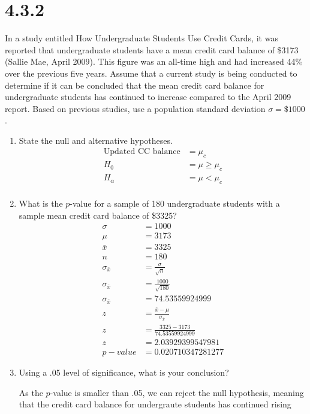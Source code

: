 \documentclass{article}
\begin{document}
\section*{4.3.2}
In a study entitled How Undergraduate Students Use Credit Cards, it was reported that undergraduate students have a mean credit card balance of \$3173 (Sallie Mae, April 2009). This figure was an all-time high and had increased 44\% over the previous five years. Assume that a current study is being conducted to determine if it can be concluded that the mean credit card balance for undergraduate students has continued to increase compared to the April 2009 report. Based on previous studies, use a population standard deviation $\sigma =\$1000$.
\begin{enumerate}
  \item State the null and alternative hypotheses.
  \begin{align*}
    \text{Updated CC balance} &= \mu_{c}\\
    H_{0} &= \mu \geq \mu_{c}\\
    H_{\alpha} &= \mu < \mu_{c}\\
  \end{align*}

  \item What is the $p$-value for a sample of 180 undergraduate students with a sample mean credit card balance of \$3325?
  \begin{align*}
    \sigma &= 1000\\
    \mu &= 3173\\
    \bar{x} &= 3325\\
    n &= 180\\
    \sigma_{\bar{x}} &= \frac{\sigma}{\sqrt{n}}\\
    \sigma_{\bar{x}} &= \frac{1000}{\sqrt{180}}\\
    \sigma_{\bar{x}} &= 74.53559924999\\
    z &= \frac{\bar{x} - \mu}{\sigma_{\bar{x}}}\\
    z &= \frac{3325 - 3173}{74.53559924999}\\
    z &= 2.03929399547981\\
    p-value &= 0.020710347281277
  \end{align*}

  \item Using a .05 level of significance, what is your conclusion?

  As the $p$-value is smaller than .05, we can reject the null hypothesis, meaning that the credit card balance for undergraute students has continued rising

\end{enumerate}
\pagebreak
\end{document}
